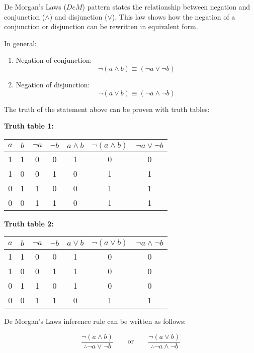 \documentclass[12pt,a4paper,openany]{article}
\begin{document}
De Morgan's Laws (\(DeM\)) pattern states the relationship between negation and conjunction (\(\land\)) and disjunction (\(\lor\)). This law shows how the negation of a conjunction or disjunction can be rewritten in equivalent form.

In general:

\begin{enumerate}
\item Negation of conjunction:
  \[\lnot (a \land b) \equiv (\lnot a \lor \lnot b)\]
\item Negation of disjunction:
  \[\lnot (a \lor b) \equiv (\lnot a \land \lnot b)\]
\end{enumerate}

The truth of the statement above can be proven with truth tables:

\textbf{Truth table 1:}

\begin{center}
\begin{tabular}{|c|c|c|c|c|c|c|}
\hline
\(a\) & \(b\) & \(\neg a\) & \(\neg b\) & \(a \land b\) & \(\neg (a \land b)\) & \(\neg a \lor \neg b\) \\
\hline
1 & 1 & 0 & 0 & 1 & 0 & 0 \\
1 & 0 & 0 & 1 & 0 & 1 & 1 \\
0 & 1 & 1 & 0 & 0 & 1 & 1 \\
0 & 0 & 1 & 1 & 0 & 1 & 1 \\
\hline
\end{tabular}
\end{center}

\textbf{Truth table 2:}

\begin{center}
\begin{tabular}{|c|c|c|c|c|c|c|}
\hline
\(a\) & \(b\) & \(\neg a\) & \(\neg b\) & \(a \lor b\) & \(\neg (a \lor b)\) & \(\neg a \land \neg b\) \\
\hline
1 & 1 & 0 & 0 & 1 & 0 & 0 \\
1 & 0 & 0 & 1 & 1 & 0 & 0 \\
0 & 1 & 1 & 0 & 1 & 0 & 0 \\
0 & 0 & 1 & 1 & 0 & 1 & 1 \\
\hline
\end{tabular}
\end{center}

De Morgan's Laws inference rule can be written as follows:

\[
\frac{\lnot (a \land b)}{\therefore \lnot a \lor \lnot b}
\qquad \text{or} \qquad
\frac{\lnot (a \lor b)}{\therefore \lnot a \land \lnot b}
\]
\end{document}

